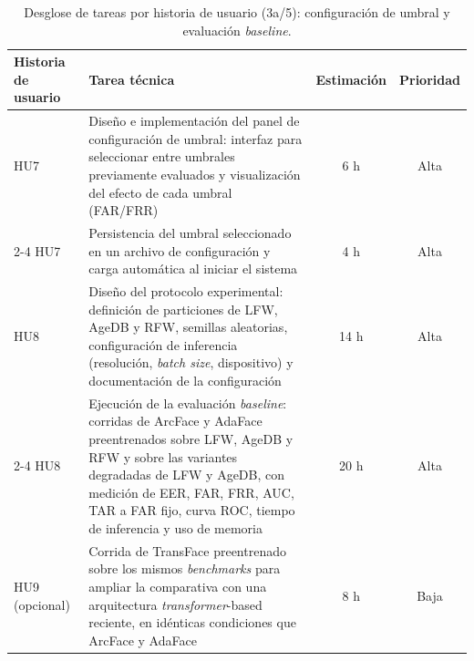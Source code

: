 \documentclass[
  11pt, %
]{charter}
\begin{document}
\begin{table}[htpb]
  \centering
  \small
  \renewcommand{\arraystretch}{0.9}
  \caption{Desglose de tareas por historia de usuario (3a/5): configuración de umbral y evaluación \textit{baseline}.}
  \begin{tabularx}{\linewidth}{@{}|X|X|c|c|@{}}
    \hline
    \rowcolor[HTML]{C0C0C0}
    Historia de usuario & Tarea técnica & Estimación & Prioridad \\ \hline

    HU7 & Diseño e implementación del panel de configuración de umbral: interfaz para seleccionar entre umbrales previamente evaluados y visualización del efecto de cada umbral (FAR/FRR) & 6 h & Alta \\ \cline{2-4}
    HU7 & Persistencia del umbral seleccionado en un archivo de configuración y carga automática al iniciar el sistema & 4 h & Alta \\ \hline

    HU8 & Diseño del protocolo experimental: definición de particiones de LFW, AgeDB y RFW, semillas aleatorias, configuración de inferencia (resolución, \textit{batch size}, dispositivo) y documentación de la configuración & 14 h & Alta \\ \cline{2-4}
    HU8 & Ejecución de la evaluación \textit{baseline}: corridas de ArcFace y AdaFace preentrenados sobre LFW, AgeDB y RFW y sobre las variantes degradadas de LFW y AgeDB, con medición de EER, FAR, FRR, AUC, TAR a FAR fijo, curva ROC, tiempo de inferencia y uso de memoria & 20 h & Alta \\ \hline

    HU9 (opcional) & Corrida de TransFace preentrenado sobre los mismos \textit{benchmarks} para ampliar la comparativa con una arquitectura \textit{transformer}-based reciente, en idénticas condiciones que ArcFace y AdaFace & 8 h & Baja \\ \hline

  \end{tabularx}
\end{table}
\end{document}
